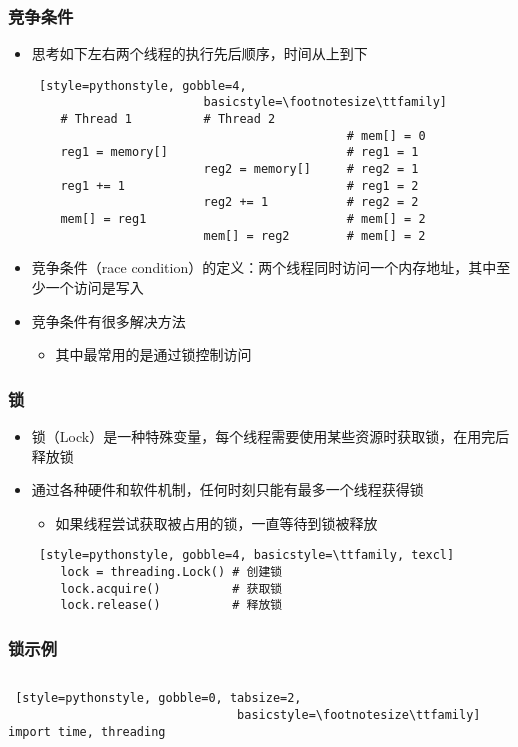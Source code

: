 \begin{CJK}{UTF8}{gbsn}
\begin{frame}[fragile]
	\frametitle{竞争条件}
	\begin{itemize}
	\item 思考如下左右两个线程的执行先后顺序，时间从上到下
	\begin{lstlisting} [style=pythonstyle, gobble=4,
						basicstyle=\footnotesize\ttfamily]
	# Thread 1			# Thread 2
											# mem[] = 0
	reg1 = memory[]							# reg1 = 1
						reg2 = memory[]		# reg2 = 1
	reg1 += 1								# reg1 = 2
						reg2 += 1			# reg2 = 2
	mem[] = reg1							# mem[] = 2
						mem[] = reg2		# mem[] = 2
	\end{lstlisting}
	\item 竞争条件（race
			condition）的定义：两个线程同时访问一个内存地址，其中至少一个访问是写入
	\item 竞争条件有很多解决方法
		\begin{itemize}
		\item 其中最常用的是通过锁控制访问
		\end{itemize}
	\end{itemize}
\end{frame}

\begin{frame}[fragile]
	\frametitle{锁}
	\begin{itemize}
	\item 锁（Lock）是一种特殊变量，每个线程需要使用某些资源时获取锁，在用完后释放锁
	\item 通过各种硬件和软件机制，任何时刻只能有最多一个线程获得锁
		\begin{itemize}
		\item 如果线程尝试获取被占用的锁，一直等待到锁被释放
		\end{itemize}
	\begin{lstlisting} [style=pythonstyle, gobble=4, basicstyle=\ttfamily, texcl]
	lock = threading.Lock()	# 创建锁
	lock.acquire()			# 获取锁
	lock.release()			# 释放锁
	\end{lstlisting}
	\end{itemize}
\end{frame}

\begin{frame}[fragile]
	\frametitle{锁示例}
	\begin{columns}[T]
		\begin{column}[T]{.5\textwidth}
			\begin{lstlisting} [style=pythonstyle, gobble=0, tabsize=2, 
								basicstyle=\footnotesize\ttfamily]
import time, threading


\end{lstlisting}
\end{column}
\end{columns}
\end{frame}
\end{CJK}

